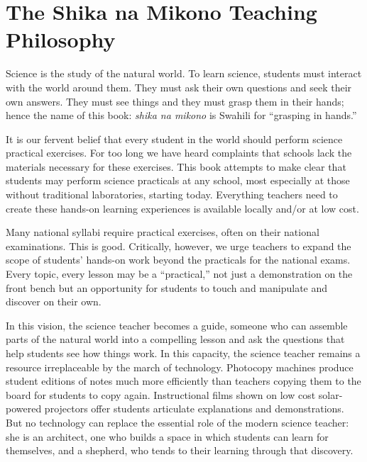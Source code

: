 \chapter{The Shika na Mikono Teaching Philosophy}

Science is the study of the natural world. 
To learn science, students must interact with the world around them. 
They must ask their own questions and seek their own answers. 
They must see things and they must grasp them in their hands; 
hence the name of this book: 
\textit{shika na mikono} is Swahili 
for ``grasping in hands.''

It is our fervent belief that every student in the world 
should perform science practical exercises. 
For too long we have heard complaints that schools lack the materials 
necessary for these exercises. 
This book attempts to make clear that students may perform 
science practicals at any school, 
most especially at those without traditional laboratories, starting today. 
Everything teachers need to create these hands-on learning experiences 
is available locally and/or at low cost.

Many national syllabi require practical exercises, 
often on their national examinations. 
This is good. 
Critically, however, we urge teachers to expand the scope of 
students' hands-on work beyond the practicals for the national exams. 
Every topic, every lesson may be a ``practical,'' 
not just a demonstration on the front bench 
but an opportunity for students to touch 
and manipulate and discover on their own.

In this vision, the science teacher becomes a guide, 
someone who can assemble parts of the natural world 
into a compelling lesson and ask the questions that help students see how things work. 
In this capacity, the science teacher remains a resource 
irreplaceable by the march of technology. 
Photocopy machines produce student editions of notes 
much more efficiently than teachers copying them to the board 
for students to copy again. 
Instructional films shown on low cost solar-powered projectors 
offer students articulate explanations and demonstrations. 
But no technology can replace the essential role of 
the modern science teacher: she is an architect, 
one who builds a space in which students can learn for themselves, 
and a shepherd, who tends to their learning through that discovery.

